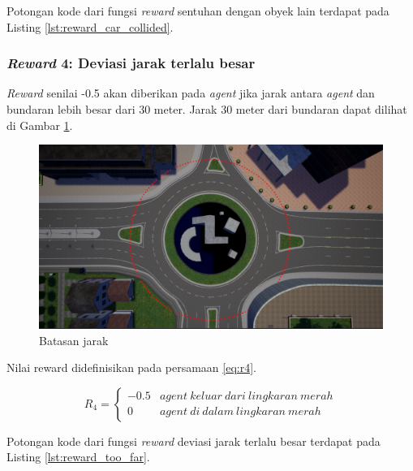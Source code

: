 Potongan kode dari fungsi \textit{reward} sentuhan dengan obyek lain terdapat pada Listing \ref{lst:reward_car_collided}.



\subsubsection{\textit{Reward} 4: Deviasi jarak terlalu besar}
\textit{Reward} senilai -0.5 akan diberikan pada \textit{agent} jika jarak antara \textit{agent} dan bundaran lebih besar dari 30 meter. Jarak 30 meter dari bundaran dapat dilihat di Gambar \ref{fig:punishment_lane_line}.

\begin{figure}[H] 
	\centering
	\includegraphics[width=1\linewidth]{images/punishment_lane_line}
	\caption{Batasan jarak}
	\label{fig:punishment_lane_line}
\end{figure}

Nilai reward didefinisikan pada persamaan \ref{eq:r4}.

\begin{equation}
	R_4 = \begin{cases}-0.5 & agent\: keluar\:dari\:lingkaran\:merah\\0 & agent\:di\:dalam\:lingkaran\: merah\end{cases}
	\label{eq:r4}
\end{equation}


Potongan kode dari fungsi \textit{reward} deviasi jarak terlalu besar terdapat pada Listing \ref{lst:reward_too_far}.




